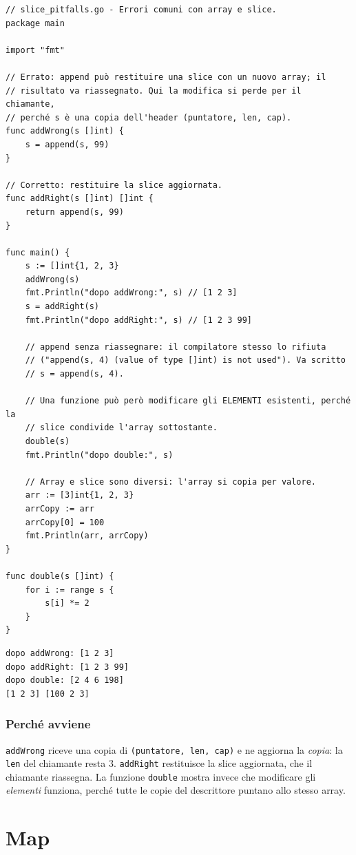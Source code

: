 \documentclass[11pt,a4paper]{report}
\newcommand{\cod}[1]{\texttt{#1}}
\begin{document}
\begin{lstlisting}[style=gocode,caption={\texttt{04\_data\_structures/slice\_pitfalls.go}}]
// slice_pitfalls.go - Errori comuni con array e slice.
package main

import "fmt"

// Errato: append può restituire una slice con un nuovo array; il
// risultato va riassegnato. Qui la modifica si perde per il chiamante,
// perché s è una copia dell'header (puntatore, len, cap).
func addWrong(s []int) {
	s = append(s, 99)
}

// Corretto: restituire la slice aggiornata.
func addRight(s []int) []int {
	return append(s, 99)
}

func main() {
	s := []int{1, 2, 3}
	addWrong(s)
	fmt.Println("dopo addWrong:", s) // [1 2 3]
	s = addRight(s)
	fmt.Println("dopo addRight:", s) // [1 2 3 99]

	// append senza riassegnare: il compilatore stesso lo rifiuta
	// ("append(s, 4) (value of type []int) is not used"). Va scritto
	// s = append(s, 4).

	// Una funzione può però modificare gli ELEMENTI esistenti, perché la
	// slice condivide l'array sottostante.
	double(s)
	fmt.Println("dopo double:", s)

	// Array e slice sono diversi: l'array si copia per valore.
	arr := [3]int{1, 2, 3}
	arrCopy := arr
	arrCopy[0] = 100
	fmt.Println(arr, arrCopy)
}

func double(s []int) {
	for i := range s {
		s[i] *= 2
	}
}
\end{lstlisting}
\begin{lstlisting}[style=output]
dopo addWrong: [1 2 3]
dopo addRight: [1 2 3 99]
dopo double: [2 4 6 198]
[1 2 3] [100 2 3]
\end{lstlisting}

\subsubsection*{Perché avviene}

\cod{addWrong} riceve una copia di \cod{(puntatore, len, cap)} e ne aggiorna la
\emph{copia}: la \cod{len} del chiamante resta 3. \cod{addRight} restituisce la
slice aggiornata, che il chiamante riassegna. La funzione \cod{double} mostra
invece che modificare gli \emph{elementi} funziona, perché tutte le copie del
descrittore puntano allo stesso array.

\section{Map}\label{sec:map}
\end{document}
